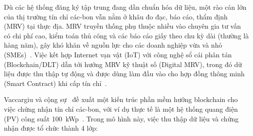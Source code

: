 Dù các hệ thống đăng ký tập trung đang dần chuẩn hóa dữ liệu, một rào cản lớn của thị trường tín chỉ các-bon vẫn nằm ở khâu đo đạc, báo cáo, thẩm định (MRV) tại thực địa. MRV truyền thống phụ thuộc nhiều vào chuyên gia tư vấn có chi phí cao, kiểm toán thủ công và các báo cáo giấy theo chu kỳ dài (thường là hàng năm), gây khó khăn về nguồn lực cho các doanh nghiệp vừa và nhỏ (SMEs)~\cite{tsai2024blockchain}. Việc kết hợp Internet vạn vật (IoT) với công nghệ sổ cái phân tán (Blockchain/DLT) dẫn tới hướng MRV kỹ thuật số (Digital MRV), trong đó dữ liệu được thu thập tự động và được dùng làm đầu vào cho hợp đồng thông minh (Smart Contract) khi cấp tín chỉ~\cite{vaccargiu2026blockchain}.

Vaccargiu và cộng sự~\cite{vaccargiu2026blockchain} đề xuất một kiến trúc phần mềm hướng blockchain cho việc chứng nhận tín chỉ các-bon, với ví dụ thực tế là một hệ thống quang điện (PV) công suất 100~kWp~\cite{vaccargiu2026blockchain}. Trong mô hình này, việc thu thập dữ liệu và chứng nhận được tổ chức thành 4 lớp:

